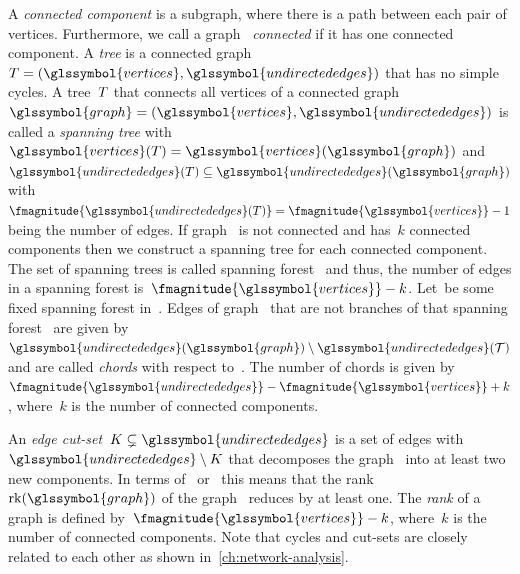 A \emph{connected component} is a subgraph, where there is a path between each
pair of vertices. Furthermore, we call a graph~
\emph{connected} if it has one connected component. A \emph{tree} is a connected
graph~$\tree = (\glssymbol{vertices}, \glssymbol{undirectededges})$ that has no
simple cycles. A tree~$T$ that connects all vertices of a connected graph~$
    \glssymbol{graph} 
    = (\glssymbol{vertices},\glssymbol{undirectededges})
$ is called a \emph{spanning tree} with~$
    \glssymbol{vertices}(\tree)
    =
    \glssymbol{vertices}(\glssymbol{graph})
$ and~$
    \glssymbol{undirectededges}(\tree)
    \subseteq
    \glssymbol{undirectededges}(\glssymbol{graph})
$ with~$
    \fmagnitude{\glssymbol{undirectededges}(\tree)} 
    =
    \fmagnitude{\glssymbol{vertices}} 
    - 
    1
$ being the number of edges. If graph~ is not connected and
has~$k$ connected components then we construct a spanning tree for each
connected component. The set of spanning trees is called spanning forest~\forest
and thus, the number of edges in a spanning forest
is~$
    \fmagnitude{\glssymbol{vertices}}
    -
    k
$. Let~\forest be some fixed spanning forest in~. Edges of
graph~ that are not branches of that spanning forest~\forest
are given by~$
    \glssymbol{undirectededges}(\glssymbol{graph})
    \setminus
    \glssymbol{undirectededges}(\forest)
$ and are called \emph{chords} with respect to~\forest. The number of chords is 
given by~$
    \fmagnitude{\glssymbol{undirectededges}}
    -
    \fmagnitude{\glssymbol{vertices}} 
    +
    k
$, where~$k$ is the number of connected components.

An \emph{edge cut-set}~$\cutset\subsetneq\glssymbol{undirectededges}$ is a set
of edges with~$\glssymbol{undirectededges}\setminus\cutset$ that decomposes the
graph~ into at least two new components. In terms
of~\textcite{Whi32a} or~\textcite[p.27]{Ses61} this means that the
rank~$\rank(\glssymbol{graph})$ of the graph~ reduces by at
least one. The \emph{rank} of a graph is defined
by~$\fmagnitude{\glssymbol{vertices}} - k$, where~$k$ is the number of connected
components. Note that cycles and cut-sets are closely related to each other as
shown in~\cref{ch:network-analysis}.

